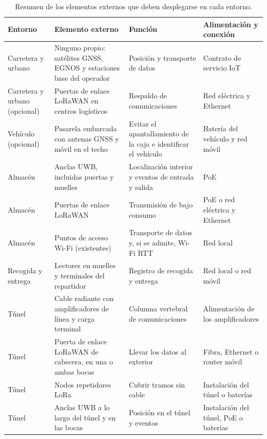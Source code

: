 \documentclass[11pt,a4paper]{article}
\begin{document}
\begin{table}[H]
    \centering
    \footnotesize
    \renewcommand{\arraystretch}{1.15}
    \begin{tabular}{@{}L{2.9cm}L{4.5cm}L{4.2cm}L{3.1cm}@{}}
        \toprule
        \textbf{Entorno} & \textbf{Elemento externo} & \textbf{Función} & \textbf{Alimentación y conexión} \\
        \midrule
        Carretera y urbano & Ninguno propio: satélites GNSS, EGNOS y estaciones base del operador & Posición y transporte de datos & Contrato de servicio IoT \\
        Carretera y urbano (opcional) & Puertas de enlace LoRaWAN en centros logísticos & Respaldo de comunicaciones & Red eléctrica y Ethernet \\
        Vehículo (opcional) & Pasarela embarcada con antenas GNSS y móvil en el techo & Evitar el apantallamiento de la caja e identificar el vehículo & Batería del vehículo y red móvil \\
        Almacén & Anclas UWB, incluidas puertas y muelles & Localización interior y eventos de entrada y salida & PoE \\
        Almacén & Puertas de enlace LoRaWAN & Transmisión de bajo consumo & PoE o red eléctrica y Ethernet \\
        Almacén & Puntos de acceso Wi-Fi (existentes) & Transporte de datos y, si se admite, Wi-Fi RTT & Red local \\
        Recogida y entrega & Lectores en muelles y terminales del repartidor & Registro de recogida y entrega & Red local o red móvil \\
        Túnel & Cable radiante con amplificadores de línea y carga terminal & Columna vertebral de comunicaciones & Alimentación de los amplificadores \\
        Túnel & Puerta de enlace LoRaWAN de cabecera, en una o ambas bocas & Llevar los datos al exterior & Fibra, Ethernet o router móvil \\
        Túnel & Nodos repetidores LoRa & Cubrir tramos sin cable & Instalación del túnel o baterías \\
        Túnel & Anclas UWB a lo largo del túnel y en las bocas & Posición en el túnel y eventos & Instalación del túnel, PoE o baterías \\
        \bottomrule
    \end{tabular}
    \caption{Resumen de los elementos externos que deben desplegarse en cada entorno.}
    \label{tab:elementos_desplegar}
\end{table}
\end{document}
